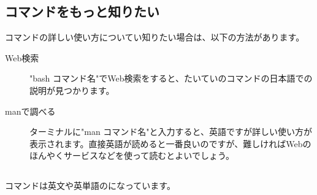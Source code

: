 \documentclass[text03.tex]{subfiles}
\begin{document}
\subsection{コマンドをもっと知りたい}
コマンドの詳しい使い方についてい知りたい場合は、以下の方法があります。
\begin{description}
    \item[Web検索] "bash コマンド名"でWeb検索をすると、たいていのコマンドの日本語での説明が見つかります。
    \item[manで調べる] ターミナルに"man コマンド名"と入力すると、英語ですが詳しい使い方が表示されます。直接英語が読めると一番良いのですが、難しければWebのほんやくサービスなどを使って読むとよいでしょう。
\end{description}

\subsection{}
\label{英語と日本語の対応表}
コマンドは英文や英単語のになっています。\\
\end{document}
